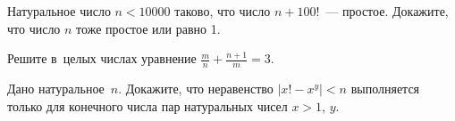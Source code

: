 


\begin{problems}
    \def\abs#1{\lvert #1 \rvert}%

\item
Натуральное число $n < 10000$ таково, что число $n + 100!$~--- простое.
Докажите, что число $n$ тоже простое или равно 1.

\item
Решите в~целых числах уравнение $\frac{m}{n} + \frac{n + 1}{m} = 3$.

\item
Дано натуральное~$n$.
Докажите, что неравенство $\abs{x! - x^{y}} < n$ выполняется только для
конечного числа пар натуральных чисел $x > 1$, $y$.

\end{problems}

